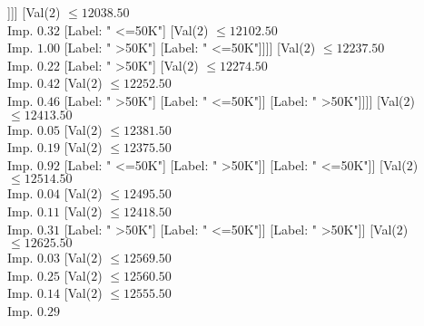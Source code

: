 \documentclass[margin=10pt]{standalone}
\begin{document}
\begin{forest}
																																			[Label: " >50K"]
																																			[Val($2$) $ \leq 11926.50$ \\ Imp. $0.07$
																																				[Label: " <=50K"]
																																				[Label: " >50K"]]]]
																																	[Val($2$) $ \leq 12038.50$ \\ Imp. $0.32$
																																		[Label: " <=50K"]
																																		[Val($2$) $ \leq 12102.50$ \\ Imp. $1.00$
																																			[Label: " >50K"]
																																			[Label: " <=50K"]]]]
																																[Val($2$) $ \leq 12237.50$ \\ Imp. $0.22$
																																	[Label: " >50K"]
																																	[Val($2$) $ \leq 12274.50$ \\ Imp. $0.42$
																																		[Val($2$) $ \leq 12252.50$ \\ Imp. $0.46$
																																			[Label: " >50K"]
																																			[Label: " <=50K"]]
																																		[Label: " >50K"]]]]
																															[Val($2$) $ \leq 12413.50$ \\ Imp. $0.05$
																																[Val($2$) $ \leq 12381.50$ \\ Imp. $0.19$
																																	[Val($2$) $ \leq 12375.50$ \\ Imp. $0.92$
																																		[Label: " <=50K"]
																																		[Label: " >50K"]]
																																	[Label: " <=50K"]]
																																[Val($2$) $ \leq 12514.50$ \\ Imp. $0.04$
																																	[Val($2$) $ \leq 12495.50$ \\ Imp. $0.11$
																																		[Val($2$) $ \leq 12418.50$ \\ Imp. $0.31$
																																			[Label: " >50K"]
																																			[Label: " <=50K"]]
																																		[Label: " >50K"]]
																																	[Val($2$) $ \leq 12625.50$ \\ Imp. $0.03$
																																		[Val($2$) $ \leq 12569.50$ \\ Imp. $0.25$
																																			[Val($2$) $ \leq 12560.50$ \\ Imp. $0.14$
																																				[Val($2$) $ \leq 12555.50$ \\ Imp. $0.29$

\end{forest}
\end{document}
